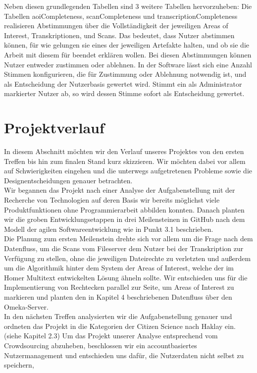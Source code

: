 \documentclass{article}
\begin{document}
Neben diesen grundlegenden Tabellen sind 3 weitere Tabellen hervorzuheben:
Die Tabellen aoiCompleteness, scanCompleteness und transcriptionCompleteness
realisieren Abstimmungen über die Vollständigkeit der jeweiligen Areas of Interest, Transkriptionen, und Scans.
Das bedeutet, dass Nutzer abstimmen können,
für wie gelungen sie eines der jeweiligen Artefakte halten,
und ob sie die Arbeit mit diesem für beendet erklären wollen.
Bei diesen Abstimmungen können Nutzer entweder zustimmen oder ablehnen.
In der Software lässt sich eine Anzahl Stimmen konfigurieren,
die für Zustimmung oder Ablehnung notwendig ist,
und als Entscheidung der Nutzerbasis gewertet wird.
Stimmt ein als Administrator markierter Nutzer ab,
so wird dessen Stimme sofort als Entscheidung gewertet.

\section{Projektverlauf}
In diesem Abschnitt möchten wir den Verlauf unseres Projektes von den ersten Treffen bis hin zum finalen Stand kurz skizzieren.
Wir möchten dabei vor allem auf Schwierigkeiten eingehen und die unterwegs aufgetretenen Probleme sowie die Designentscheidungen genauer betrachten. \\
Wir begannen das Projekt nach einer Analyse der Aufgabenstellung mit der Recherche von Technologien auf deren Basis wir bereits möglichst viele Produktfunktionen ohne Programmierarbeit abbilden konnten.
Danach planten wir die groben Entwicklungsetappen in drei Meilensteinen in GitHub nach dem Modell der agilen Softwareentwicklung wie in Punkt 3.1 beschrieben.\\
Die Planung zum ersten Meilenstein drehte sich vor allem um die Frage nach dem Datenfluss, um die Scans vom Fileserver dem Nutzer bei der Transkription zur Verfügung zu stellen, 
ohne die jeweiligen Dateirechte zu verletzten und außerdem um die Algorithmik hinter dem System der Areas of Interest, welche der im Homer Multitext entwickelten Lösung ähneln sollte. 
Wir entschieden uns für die Implementierung von Rechtecken parallel zur Seite, 
um Areas of Interest zu markieren und planten den in Kapitel 4 beschriebenen Datenfluss über den Omeka-Server.\\
In den nächsten Treffen analysierten wir die Aufgabenstellung genauer und ordneten das Projekt in die Kategorien der Citizen Science nach Haklay ein. (siehe Kapitel 2.3) 
Um das Projekt unserer Analyse entsprechend vom Crowdsourcing abzuheben, beschlossen wir ein accountbasiertes Nutzermanagement und entschieden uns dafür, die Nutzerdaten nicht selbst zu speichern,
\end{document}
